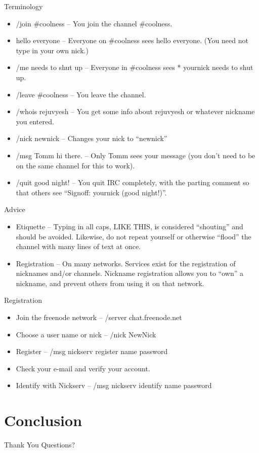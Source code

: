 \documentclass{beamer}
\begin{document}
\begin{frame}{Terminology}
  \begin{itemize}
  \item /join \#coolness -- You join the channel \#coolness.
  \item hello everyone  -- Everyone on \#coolness sees hello everyone. (You need not type in your own nick.)
  \item /me needs to shut up -- Everyone in \#coolness sees * yournick needs to shut up.
  \item /leave \#coolness -- You leave the channel.
  \item /whois rejuvyesh -- You get some info about rejuvyesh or whatever nickname you entered.
  \item /nick newnick -- Changes your nick to ``newnick''
  \item /msg Tomm hi there. -- Only Tomm sees your message (you don’t need to be on the same channel for this to work).
  \item /quit good night! -- You quit IRC completely, with the parting comment so that others see ``Signoff: yournick (good night!)''.
  \end{itemize}
\end{frame}

\begin{frame}{Advice}
  \begin{itemize}
  \item Etiquette --  Typing in all caps, LIKE THIS, is considered “shouting” and should be avoided. Likewise, do not repeat yourself or otherwise “flood” the channel with many lines of text at once.
  \item Registration -- On many networks. Services exist for the registration of nicknames and/or channels. Nickname registration allows you to ``own'' a nickname, and prevent others from using it on that network.
  \end{itemize}
\end{frame}

 \begin{frame}{Registration}
   \begin{itemize}
    \item Join the freenode network -- /server chat.freenode.net
    \item Choose a user name or nick --  /nick NewNick 
    \item Register -- /msg nickserv register name password
    \item Check your e-mail and verify your account.
    \item Identify with Nickserv -- /msg nickserv identify name password
   \end{itemize}
 \end{frame}
\section{Conclusion}

\begin{frame}{Thank You}
  Questions?
\end{frame}
\end{document}
